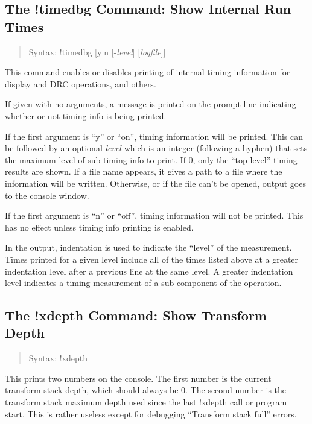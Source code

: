 \subsection{The {\cb !timedbg} Command: Show Internal Run Times}
\begin{quote}
Syntax: {\vt !timedbg} [{\vt y|n} [-{\it level\/}] [{\it logfile\/}]]
\end{quote}
This command enables or disables printing of internal timing information
for display and DRC operations, and others.

If given with no arguments, a message is printed on the prompt line
indicating whether or not timing info is being printed.

If the first argument is ``{\vt y}'' or ``{\vt on}'', timing
information will be printed.  This can be followed by an optional {\it
level} which is an integer (following a hyphen) that sets the maximum
level of sub-timing info to print.  If 0, only the ``top level''
timing results are shown.  If a file name appears, it gives a path to
a file where the information will be written.  Otherwise, or if the
file can't be opened, output goes to the console window.

If the first argument is ``{\vt n}'' or ``{\vt off}'', timing
information will not be printed.  This has no effect unless timing
info printing is enabled.

In the output, indentation is used to indicate the ``level'' of the
measurement.  Times printed for a given level include all of the times
listed above at a greater indentation level after a previous line at
the same level.  A greater indentation level indicates a timing
measurement of a sub-component of the operation.

\subsection{The {\cb !xdepth} Command: Show Transform Depth}
\begin{quote}
Syntax: {\vt !xdepth}
\end{quote}
This prints two numbers on the console.  The first number is the
current transform stack depth, which should always be 0.  The second
number is the transform stack maximum depth used since the last {\cb
!xdepth} call or program start.  This is rather useless except for
debugging ``Transform stack full'' errors.

